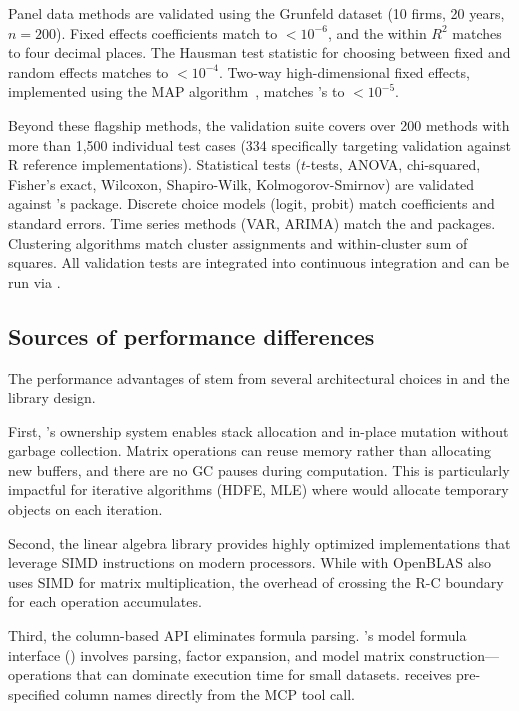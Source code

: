 Panel data methods are validated using the Grunfeld dataset (10 firms, 20 years,
$n = 200$). Fixed effects coefficients match  to $< 10^{-6}$, and the
within $R^2$ matches to four decimal places. The Hausman test statistic for
choosing between fixed and random effects matches to $< 10^{-4}$. Two-way
high-dimensional fixed effects, implemented using the MAP
algorithm~\citep{Gaure:2013}, matches 's  to $< 10^{-5}$.

Beyond these flagship methods, the validation suite covers over 200 methods
with more than 1,500 individual test cases (334 specifically targeting validation
against R reference implementations). Statistical tests ($t$-tests, ANOVA,
chi-squared, Fisher's exact, Wilcoxon, Shapiro-Wilk, Kolmogorov-Smirnov) are
validated against 's  package. Discrete choice models
(logit, probit) match  coefficients and standard errors. Time series
methods (VAR, ARIMA) match the  and  packages.
Clustering algorithms match  cluster assignments and within-cluster
sum of squares. All validation tests are integrated into continuous integration
and can be run via .

\subsection{Sources of performance differences}

The performance advantages of  stem from several
architectural choices in  and the library design.

First, 's ownership system enables stack allocation and in-place
mutation without garbage collection. Matrix operations can reuse memory rather
than allocating new buffers, and there are no GC pauses during computation.
This is particularly impactful for iterative algorithms (HDFE, MLE) where
 would allocate temporary objects on each iteration.

Second, the  linear algebra library provides highly optimized
implementations that leverage SIMD instructions on modern processors. While
 with OpenBLAS also uses SIMD for matrix multiplication, the
overhead of crossing the R-C boundary for each operation accumulates.

Third, the column-based API eliminates formula parsing. 's model
formula interface () involves parsing, factor expansion,
and model matrix construction---operations that can dominate execution time
for small datasets.  receives pre-specified column names
directly from the MCP tool call.

